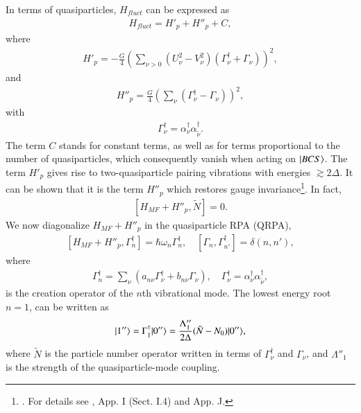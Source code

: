 In terms of quasiparticles, $H_{fluct}$ can be expressed  as
\begin{align}\label{eq0.1.91}
H_{fluct}=H'_p+H''_p+C,
\end{align}
where 
\begin{align}\label{eq0.1.92}
H'_p=-\frac{G}{4}\left(\sum_{\nu>0}\left(U^2_\nu-V^2_\nu\right)\left(\Gamma^\dagger_\nu+\Gamma_\nu\right)\right)^2,
\end{align}
and
\begin{align}\label{eq0.1.93}
H''_p=\frac{G}{4}\left(\sum_{\nu}\left(\Gamma^\dagger_\nu-\Gamma_\nu\right)\right)^2,
\end{align}
with
\begin{align}\label{eq0.1.94}
\Gamma^\dagger_\nu=\alpha^\dagger_\nu\alpha_{\tilde \nu}^\dagger.
\end{align}
The term $C$ stands for constant terms, as well as for terms proportional to the number of quasiparticles, which consequently vanish when acting on $|{BCS} \rangle$. The term $H'_p$ gives rise to two-quasiparticle pairing vibrations with energies $\gtrsim2\Delta$. It can be shown that it is the term $H''_p$ which restores  
  gauge invariance\footnote{\cite{Hogassen:61,Bes:66}. For details see \cite{Brink:05}, App. I (Sect. I.4) and App. J.}. In fact,
\begin{align}\label{eq0.1.95}
\left[H_{MF}+H''_p,\tilde N\right]=0.
\end{align}
We now diagonalize $H_{MF}+H''_p$ in the quasiparticle RPA (QRPA),
\begin{align}\label{eq0.1.96}
\left[H_{MF}+H''_p,\Gamma^\dagger_n\right]=\hbar\omega_n\Gamma^\dagger_n,\quad \left[\Gamma_n,\Gamma^\dagger_{n'}\right]=\delta(n,n'),
\end{align}
where
\begin{align}\label{eq0.1.97}
\Gamma^\dagger_n=\sum_{\nu}\left(a_{n\nu}\Gamma^\dagger_\nu+b_{n\nu}\Gamma_\nu\right),\quad \Gamma^\dagger_\nu=\alpha^\dagger_\nu\alpha^\dagger_{\tilde\nu},	
\end{align}
is the creation operator of the $n$th vibrational mode. The lowest  energy root $n=1$,  can be written as
\begin{align}\label{eq0.1.98}
|{1''} \rangle=\Gamma^\dagger_1|{0''} \rangle=\frac{\Lambda''_1}{2\Delta}(\tilde N-N_0)|{0''} \rangle,	
\end{align}
where $\tilde N$ is the particle number operator written in terms of $\Gamma^\dagger_\nu$ and $\Gamma_\nu$, and $\Lambda''_1$ is the strength of the quasiparticle-mode coupling. 

